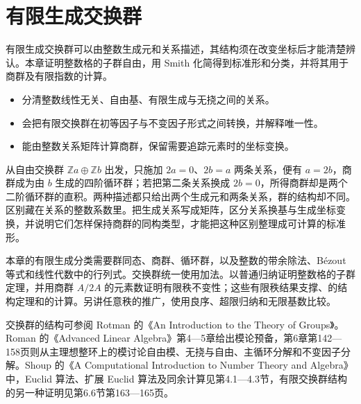
\chapter{有限生成交换群}
\label{b1:ch:09}

\begin{chapterabstract}
	有限生成交换群可以由整数生成元和关系描述，其结构须在改变坐标后才能清楚辨认。本章证明整数格的子群自由，用 Smith 化简得到标准形和分类，并将其用于商群及有限指数的计算。
\end{chapterabstract}

\begin{learninggoals}
	\begin{itemize}
		\item 分清整数线性无关、自由基、有限生成与无挠之间的关系。
		\item 会把有限交换群在初等因子与不变因子形式之间转换，并解释唯一性。
		\item 能由整数关系矩阵计算商群，保留需要追踪元素时的坐标变换。
	\end{itemize}
\end{learninggoals}

从自由交换群 \(\mathbb Z a\oplus\mathbb Z b\) 出发，只施加 \(2a=0\)、\(2b=a\) 两条关系，便有 \(a=2b\)，商群成为由 \(b\) 生成的四阶循环群；若把第二条关系换成 \(2b=0\)，所得商群却是两个二阶循环群的直积。两种描述都只给出两个生成元和两条关系，群的结构却不同。区别藏在关系的整数系数里。把生成关系写成矩阵，区分关系换基与生成坐标变换，并说明它们怎样保持商群的同构类型，才能把这种区别整理成可计算的标准形。

\ProseParagraphBreak

本章的有限生成分类需要群同态、商群、循环群，以及整数的带余除法、Bézout 等式和线性代数中的行列式。交换群统一使用加法。以普通归纳证明整数格的子群定理，并用商群 \(A/2A\) 的元素数证明有限秩不变性；这些有限秩结果支撑、的结构定理和的计算。另讲任意秩的推广，使用良序、超限归纳和无限基数比较。

\ProseParagraphBreak
交换群的结构可参阅 Rotman 的《An Introduction to the Theory of Groups》\cite[Chapter 10]{Rotman1995TheoryGroups}。Roman 的《Advanced Linear Algebra》第4—5章给出模论预备，第6章第142—158页则从主理想整环上的模讨论自由模、无挠与自由、主循环分解和不变因子分解\cite[Chapters 4--5; Chapter 6, pp. 142--158]{Roman2008AdvancedLinearAlgebra}。Shoup 的《A Computational Introduction to Number Theory and Algebra》中，Euclid 算法、扩展 Euclid 算法及同余计算见第4.1—4.3节\cite[Sections 4.1--4.3]{Shoup2008NumberTheoryAlgebra}，有限交换群结构的另一种证明见第6.6节第163—165页\cite[Section 6.6, pp. 163--165]{Shoup2008NumberTheoryAlgebra}。


